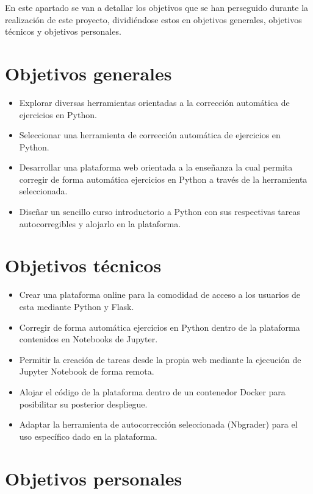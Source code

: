
En este apartado se van a detallar los objetivos que se han perseguido durante la realización de este proyecto, dividiéndose estos en objetivos generales, objetivos técnicos y objetivos personales.

\section{Objetivos generales}

\begin{itemize}
  \item Explorar diversas herramientas orientadas a la corrección automática
  de ejercicios en Python.
  \item Seleccionar una herramienta de corrección automática de ejercicios en Python.
  \item Desarrollar una plataforma web orientada a la enseñanza la cual permita corregir de forma automática ejercicios en Python a través de la herramienta seleccionada.
  \item Diseñar un sencillo curso introductorio a Python con sus respectivas tareas autocorregibles y alojarlo en la plataforma.
\end{itemize}


\section{Objetivos técnicos}
\begin{itemize}
  \item Crear una plataforma online para la comodidad de acceso a los usuarios de esta mediante Python y Flask.
  \item Corregir de forma automática ejercicios en Python dentro de la plataforma contenidos en Notebooks de Jupyter.
  \item Permitir la creación de tareas desde la propia web mediante la ejecución de Jupyter Notebook de forma remota.
  \item Alojar el código de la plataforma dentro de un contenedor Docker para posibilitar su posterior despliegue.
  \item Adaptar la herramienta de autocorrección seleccionada (Nbgrader) para el uso específico dado en la plataforma.
   
\end{itemize}

\section{Objetivos personales}

